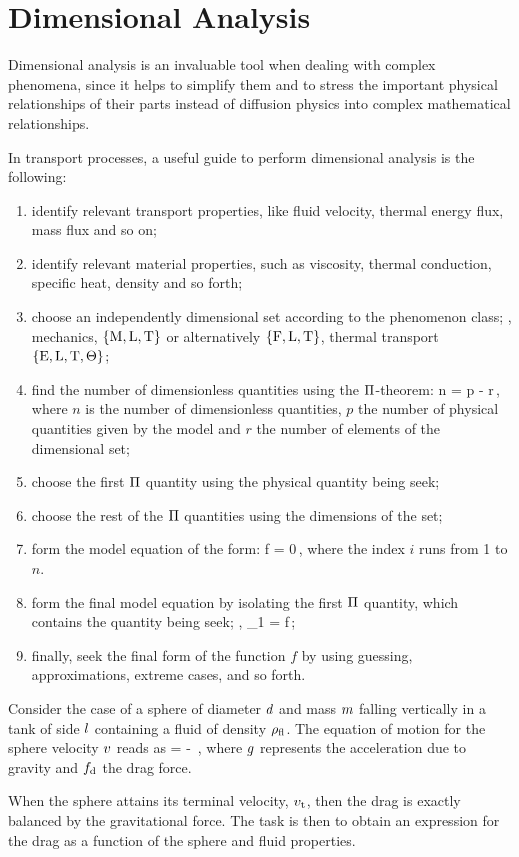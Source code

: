 \section{Dimensional Analysis}
%
Dimensional analysis is an invaluable tool when dealing with complex phenomena, since it helps to simplify them and to stress the important physical relationships of their parts instead of diffusion physics into complex mathematical relationships. 

In transport processes, a useful guide to perform dimensional analysis is the following:
\begin{enumerate}
\item identify relevant transport properties, like fluid velocity, thermal energy flux, mass flux and so on;
\item identify relevant material properties, such as viscosity, thermal conduction, specific heat, density and so forth;
\item choose an independently dimensional set according to the phenomenon class; \ie, mechanics, $\left\lbrace{\text{M}, \text{L}, \text{T}}\right\rbrace$ or alternatively $\left\lbrace{\text{F}, \text{L}, \text{T}}\right\rbrace$, thermal transport $\left\lbrace{\text{E}, \text{L}, \text{T}, \Theta}\right\rbrace$;
\item find the number of dimensionless quantities using the $\Pi$-theorem:
\beq
n = p - r\,,
\eeq
where $n$ is the number of dimensionless quantities, $p$ the number of physical quantities given by the model and $r$ the number of elements of the dimensional set;
\item choose the first $\Pi$ quantity using the physical quantity being seek;
\item choose the rest of the $\Pi$ quantities using the dimensions of the set;
\item form the model equation of the form:
\beq
f = 0\,,
\eeq
where the index $i$ runs from 1 to $n$.
\item form the final model equation by isolating the first $\Pi$ quantity, which contains the quantity being seek; \ie,
\beq
\kdim_1 = f\,;
\eeq
\item finally, seek the final form of the function $f$ by using guessing, approximations, extreme cases, and so forth.
\end{enumerate}

\begin{example}
Consider the case of a sphere of diameter $d$ and mass $m$ falling vertically in a tank of side $l$ containing a fluid of density $\rho_\text{fl}$. The equation of motion for the sphere velocity $v$ reads as
\beq
\mass \dt\vel = \mass\grav - \drag\,,
\eeq
where $g$ represents the acceleration due to gravity and $f_\text{d}$ the drag force. 

When the sphere attains its terminal velocity, $v_\text{t}$, then the drag is exactly balanced by the gravitational force. The task is then to obtain an expression for the drag as a function of the sphere and fluid properties.
\end{example}

